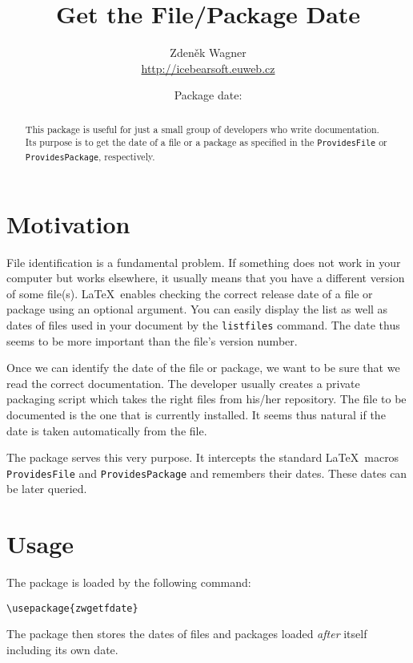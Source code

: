 \documentclass[11pt]{article}
\DeclareRobustCommand\cmd[1]{\texttt{\Bslash#1}}
\begin{document}
\title{Get the File/Package Date}
\author{Zdeněk Wagner\\\url{http://icebearsoft.euweb.cz}}
\date{Package date: }
\maketitle

\begin{abstract}\noindent
This package is useful for just a small group of developers who write documentation. Its purpose is
to get the date of a file or a package as specified in the \cmd{ProvidesFile} or
\cmd{ProvidesPackage}, respectively.
\end{abstract}

\tableofcontents

\section{Motivation}
File identification is a fundamental problem. If something does not work in your computer but works
elsewhere, it usually means that you have a different version of some file(s). \LaTeX\ enables checking
the correct release date of a file or package using an optional argument. You can easily display
the list as well as dates of files used in your document by the \cmd{listfiles} command. The date
thus seems to be more important than the file's version number.

Once we can identify the date of the file or package, we want to be sure that we read the correct
documentation. The developer usually creates a private packaging script which takes the right files from
his/her repository. The file to be documented is the one that is currently installed. It seems thus
natural if the date is taken automatically from the file.

The package serves this very purpose. It intercepts the standard \LaTeX\ macros \cmd{ProvidesFile} and
\cmd{ProvidesPackage} and remembers their dates. These dates can be later queried.

\section{Usage}
The package is loaded by the following command:

\medskip
\verb;\usepackage{zwgetfdate};

\medskip
The package then stores the dates of files and packages loaded \emph{after} itself including its
own date.
\end{document}
